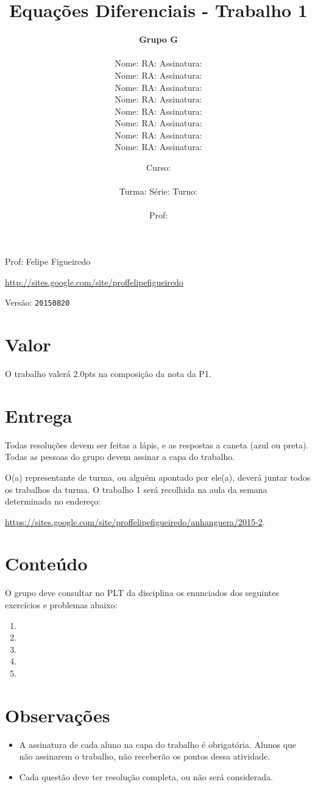 \documentclass[a4paper]{article}
\date{
\bigskip
Curso: \underline{\hspace{8cm}}\\
\ \\
Turma: \underline{\hspace{1cm}} Série: \underline{\hspace{1cm}} Turno:
\underline{\hspace{1cm}}\\
\ \\
Prof: \underline{\hspace{8cm}}\\
}
\title{Equações Diferenciais - Trabalho 1}
\author{
{\bf Grupo G}\\
\ \\
Nome: \underline{\hspace{6cm}} RA: \underline{\hspace{2cm}} Assinatura: \underline{\hspace{4cm}}\\
Nome: \underline{\hspace{6cm}} RA: \underline{\hspace{2cm}} Assinatura: \underline{\hspace{4cm}}\\
Nome: \underline{\hspace{6cm}} RA: \underline{\hspace{2cm}} Assinatura: \underline{\hspace{4cm}}\\
Nome: \underline{\hspace{6cm}} RA: \underline{\hspace{2cm}} Assinatura: \underline{\hspace{4cm}}\\
Nome: \underline{\hspace{6cm}} RA: \underline{\hspace{2cm}} Assinatura: \underline{\hspace{4cm}}\\
Nome: \underline{\hspace{6cm}} RA: \underline{\hspace{2cm}} Assinatura: \underline{\hspace{4cm}}\\
Nome: \underline{\hspace{6cm}} RA: \underline{\hspace{2cm}} Assinatura: \underline{\hspace{4cm}}\\
Nome: \underline{\hspace{6cm}} RA: \underline{\hspace{2cm}} Assinatura: \underline{\hspace{4cm}}\\
}
\begin{document}
\maketitle

\newpage
\parbox[c]{.825\textwidth}{\raggedright%
{Prof: Felipe Figueiredo\par}
{\url{http://sites.google.com/site/proffelipefigueiredo}\par}
}

Versão: \verb|20150820|




\section{Valor}
O trabalho valerá $2.0$pts na composição da nota da P1.

\section{Entrega}


Todas resoluções devem ser feitas a lápis, e as respostas a caneta
(azul ou preta). Todas as pessoas do grupo devem assinar a capa do
trabalho.

O(a) representante de turma, ou alguém apontado por ele(a), deverá
juntar todos os trabalhos da turma. O trabalho 1 será recolhida na
aula da semana determinada no endereço:

\url{https://sites.google.com/site/proffelipefigueiredo/anhanguera/2015-2}.

\section{Conteúdo}

O grupo deve consultar no PLT da disciplina os enunciados dos
seguintes exercícios e problemas abaixo:

\begin{enumerate}
\item 
\item 
\item 
\item 
\item 
\end{enumerate}

\section{Observações}

\begin{itemize}
\item A assinatura de cada aluno na capa do trabalho é
  obrigatória. Alunos que não assinarem o trabalho, não receberão os
  pontos dessa atividade.
\item Cada questão deve ter resolução completa, ou não será
  considerada.
\end{itemize}

 
\end{document}
